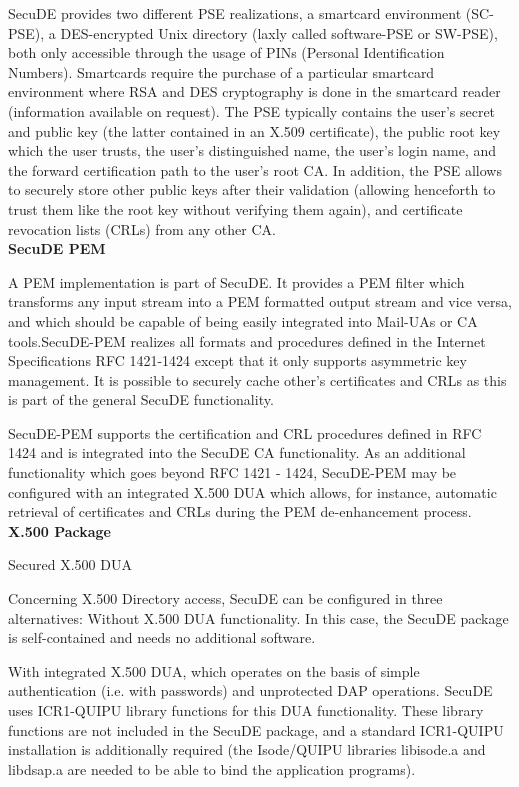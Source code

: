 SecuDE provides two different PSE realizations,
\bi 
\m a smartcard environment (SC-PSE), 
\m a DES-encrypted Unix directory (laxly called software-PSE or SW-PSE),
\ei 
both only accessible through the usage of PINs (Personal Identification Numbers).
Smartcards require the purchase of a particular smartcard environment where 
RSA and DES cryptography is done in the smartcard reader (information available 
on request).
The PSE typically contains the user's secret and public key (the latter
contained in an X.509 certificate), the public root key which the user
trusts, the user's distinguished name, the user's login name, and the 
forward certification path to the user's root CA. In addition, the PSE 
allows to securely store other public keys after their validation 
(allowing henceforth to trust them like the root key without verifying 
them again), and certificate revocation lists (CRLs) from any other CA.
\\ [1em]
{\bf SecuDE PEM}

A PEM implementation is part of SecuDE. It provides a PEM filter
which transforms any input stream into a PEM formatted output stream 
and vice versa, and which should be capable of being  easily 
integrated into Mail-UAs or CA tools.SecuDE-PEM realizes all formats 
and procedures defined in the Internet Specifications RFC 1421-1424 
except that it only supports asymmetric key management. It is
possible to securely cache other's certificates and CRLs as this 
is part of the general SecuDE functionality.

SecuDE-PEM supports the certification and CRL procedures defined in RFC 
1424 and is integrated into the SecuDE CA functionality. As an additional 
functionality which goes beyond RFC 1421 - 1424, SecuDE-PEM may be 
configured with an integrated X.500 DUA which allows, for instance, 
automatic retrieval of certificates and CRLs during the PEM de-enhancement 
process.  
\\ [1em]
{\bf X.500 Package}

Secured X.500 DUA

Concerning X.500 Directory access, SecuDE can be configured in three 
alternatives:
\be
\m Without X.500 DUA functionality. In this case, the SecuDE package
   is self-contained and needs no additional software.

\m With integrated X.500 DUA, which operates on the basis of simple
   authentication (i.e. with passwords) and unprotected DAP operations.
   SecuDE uses ICR1-QUIPU library functions for this DUA functionality.
   These library functions are not included in the SecuDE package, and
   a standard ICR1-QUIPU installation is additionally required (the 
   Isode/QUIPU libraries libisode.a and libdsap.a are needed to be able 
   to bind the application programs).

